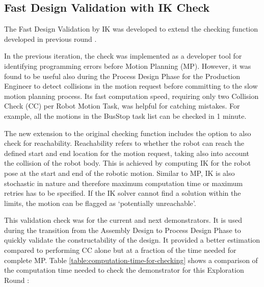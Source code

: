 \FloatBarrier

\subsection{Fast Design Validation with IK Check}
\label{subsection:exploration-4-fast-design-validation-with-ik-check}

The Fast Design Validation by IK was developed to extend the checking function developed in previous round .

In the previous iteration, the check was implemented as a developer tool for identifying programming errors before Motion Planning (MP). However, it was found to be useful also during the Process Design Phase for the Production Engineer to detect collisions in the motion request before committing to the slow motion planning process. Its fast computation speed, requiring only two Collision Check (CC) per Robot Motion Task, was helpful for catching mistakes. For example, all the motions in the BusStop task list can be checked in 1 minute. 

The new extension to the original checking function includes the option to also check for reachability. Reachability refers to whether the robot can reach the defined start and end location for the motion request, taking also into account the collision of the robot body. This is achieved by computing IK for the robot pose at the start and end of the robotic motion. Similar to MP, IK is also stochastic in nature and therefore maximum computation time or maximum retries has to be specified. If the IK solver cannot find a solution within the limits, the motion can be flagged as ‘potentially unreachable’.

This validation check was for the current and next demonstrators. It is used during the transition from the Assembly Design to Process Design Phase to quickly validate the constructability of the design. It provided a better estimation compared to performing CC alone but at a fraction of the time needed for complete MP. Table \ref{table:computation-time-for-checking} shows a comparison of the computation time needed to check the demonstrator for this Exploration Round :

